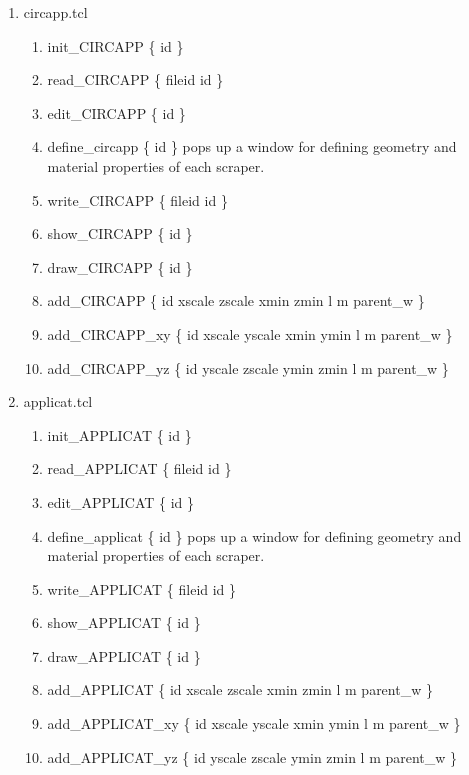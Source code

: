 \documentclass[12pt]{book}
\begin{document}
\begin{enumerate}
\item circapp.tcl
\begin{enumerate}
\item {\sf init\_CIRCAPP \{ id \}}
\item {\sf read\_CIRCAPP \{ fileid id \}}
\item {\sf edit\_CIRCAPP \{ id \}}
\item {\sf define\_circapp \{ id \}} pops up a window for defining
geometry and material properties of each scraper.
\item {\sf write\_CIRCAPP \{ fileid id \}}
\item {\sf show\_CIRCAPP \{ id \}}
\item {\sf draw\_CIRCAPP \{ id \}}
\item {\sf add\_CIRCAPP \{ id xscale zscale xmin zmin l m parent\_w \}}
\item {\sf add\_CIRCAPP\_xy \{ id xscale yscale xmin ymin l m parent\_w \}}
\item {\sf add\_CIRCAPP\_yz \{ id yscale zscale ymin zmin l m parent\_w \}}
\end{enumerate}

\item applicat.tcl
\begin{enumerate}
\item {\sf init\_APPLICAT \{ id \}}
\item {\sf read\_APPLICAT \{ fileid id \}}
\item {\sf edit\_APPLICAT \{ id \}}
\item {\sf define\_applicat \{ id \}} pops up a window for defining
geometry and material properties of each scraper.
\item {\sf write\_APPLICAT \{ fileid id \}}
\item {\sf show\_APPLICAT \{ id \}}
\item {\sf draw\_APPLICAT \{ id \}}
\item {\sf add\_APPLICAT \{ id xscale zscale xmin zmin l m parent\_w \}}
\item {\sf add\_APPLICAT\_xy \{ id xscale yscale xmin ymin l m parent\_w \}}
\item {\sf add\_APPLICAT\_yz \{ id yscale zscale ymin zmin l m parent\_w \}}
\end{enumerate}


\end{enumerate}
\end{document}
